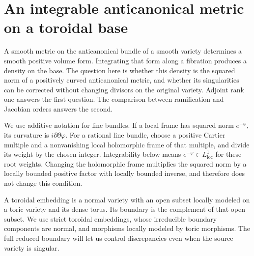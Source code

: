 \section{An integrable anticanonical metric on a toroidal base}
\label{g:sec-toroidal-volume}

A smooth metric on the anticanonical bundle of a smooth variety determines
a smooth positive volume form.  Integrating that form along a fibration
produces a density on the base.  The question here is whether this density
is the squared norm of a positively curved anticanonical metric, and
whether its singularities can be corrected without changing divisors on
the original variety.  Adjoint rank one answers the first question.
The comparison between ramification and Jacobian orders answers the
second.

We use additive notation for line bundles.  If a local frame has squared
norm $e^{-\varphi}$, its curvature is $i\partial\bar\partial\varphi$.
For a rational line bundle, choose a positive Cartier multiple and a
nonvanishing local holomorphic frame of that multiple, and divide its
weight by the chosen integer.  Integrability below means
$e^{-\varphi}\in L^1_{\mathrm{loc}}$ for these root weights.  Changing
the holomorphic frame multiplies the squared norm by a locally bounded
positive factor with locally bounded inverse, and therefore does not
change this condition.

A toroidal embedding is a normal variety with an open subset locally
modeled on a toric variety and its dense torus.  Its boundary is the
complement of that open subset.  We use strict toroidal embeddings,
whose irreducible boundary components are normal, and morphisms locally
modeled by toric morphisms.  The full reduced boundary will let us
control discrepancies even when the source variety is singular.

